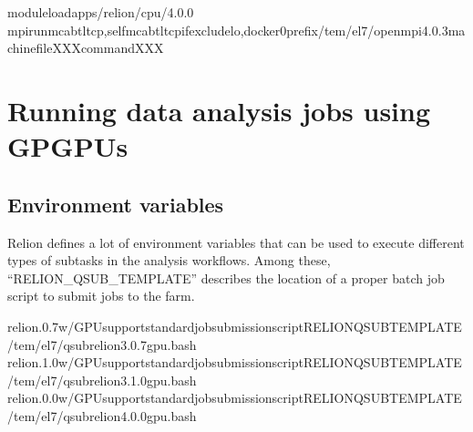 \documentclass[a4paper,10pt,english]{sphinxmanual}
\begin{document}
\begin{sphinxVerbatim}[commandchars=\\\{\}]
moduleloadapps/relion/cpu/4.0.0
mpirun\PYGZhy{}\PYGZhy{}mcabtltcp,self\PYGZhy{}\PYGZhy{}mcabtl\PYGZus{}tcp\PYGZus{}if\PYGZus{}excludelo,docker0\PYGZhy{}\PYGZhy{}prefix/tem/el7/openmpi\PYGZhy{}4.0.3\PYGZhy{}machinefileXXXcommandXXX

\end{sphinxVerbatim}


\section{Running data analysis jobs using GPGPUs}
\label{\detokenize{relion:running-data-analysis-jobs-using-gpgpus}}

\subsection{Environment variables}
\label{\detokenize{relion:id1}}
\sphinxAtStartPar
Relion defines a lot of environment variables that can be used to execute different types of subtasks in the analysis workflows. Among these, “RELION\_QSUB\_TEMPLATE” describes the location of a proper batch job script to submit jobs to the farm.

\begin{sphinxVerbatim}[commandchars=\\\{\}]
relion.0.7w/GPUsupportstandardjobsubmissionscriptRELION\PYGZus{}QSUB\PYGZus{}TEMPLATE/tem/el7/qsub\PYGZhy{}relion\PYGZhy{}3.0.7\PYGZhy{}gpu.bash
relion.1.0w/GPUsupportstandardjobsubmissionscriptRELION\PYGZus{}QSUB\PYGZus{}TEMPLATE/tem/el7/qsub\PYGZhy{}relion\PYGZhy{}3.1.0\PYGZhy{}gpu.bash
relion.0.0w/GPUsupportstandardjobsubmissionscriptRELION\PYGZus{}QSUB\PYGZus{}TEMPLATE/tem/el7/qsub\PYGZhy{}relion\PYGZhy{}4.0.0\PYGZhy{}gpu.bash
\end{sphinxVerbatim}
\end{document}
